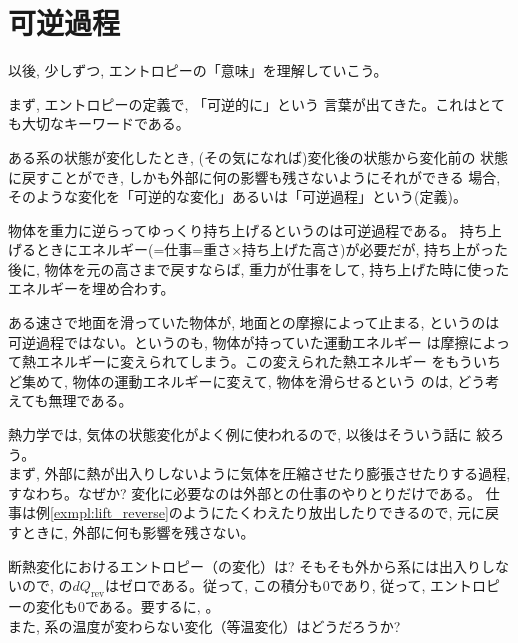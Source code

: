\section{可逆過程}

以後, 少しずつ, エントロピーの「意味」を理解していこう。

まず, エントロピーの定義で, 「可逆的に」という
言葉が出てきた。これはとても大切なキーワードである。

ある系の状態が変化したとき, (その気になれば)変化後の状態から変化前の
状態に戻すことができ, しかも外部に何の影響も残さないようにそれができる
場合, そのような変化を「可逆的な変化」あるいは「可逆過程」という(定義)。

\begin{exmpl}\label{exmpl:lift_reverse} 物体を重力に逆らってゆっくり持ち上げるというのは可逆過程である。
持ち上げるときにエネルギー(=仕事=重さ×持ち上げた高さ)が必要だが, 
持ち上がった後に, 物体を元の高さまで戻すならば, 重力が仕事をして, 
持ち上げた時に使ったエネルギーを埋め合わす。\end{exmpl}

\begin{exmpl} ある速さで地面を滑っていた物体が, 地面との摩擦によって止まる, 
というのは可逆過程ではない。というのも, 物体が持っていた運動エネルギー
は摩擦によって熱エネルギーに変えられてしまう。この変えられた熱エネルギー
をもういちど集めて, 物体の運動エネルギーに変えて, 物体を滑らせるという
のは, どう考えても無理である。\end{exmpl}

熱力学では, 気体の状態変化がよく例に使われるので, 以後はそういう話に
絞ろう。\\

まず, 外部に熱が出入りしないように気体を圧縮させたり膨張させたりする過程, 
すなわち。なぜか? 
変化に必要なのは外部との仕事のやりとりだけである。
仕事は例\ref{exmpl:lift_reverse}のようにたくわえたり放出したりできるので, 
元に戻すときに, 外部に何も影響を残さない。

断熱変化におけるエントロピー（の変化）は? そもそも外から系には出入りしないので, 
の$dQ_{\text{rev}}$はゼロである。従って, この積分も0であり, 
従って, エントロピーの変化も0である。要するに, 。\\

また, 系の温度が変わらない変化（等温変化）はどうだろうか?

